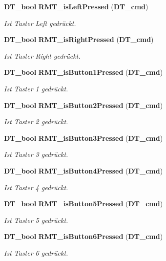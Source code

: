 \begin{DoxyCompactItemize}
{\bf DT\_\-bool} {\bf RMT\_\-isLeftPressed} ({\bf DT\_\-cmd})
\begin{DoxyCompactList}\small\item\em Ist Taster Left gedrückt. \item\end{DoxyCompactList}\item 
{\bf DT\_\-bool} {\bf RMT\_\-isRightPressed} ({\bf DT\_\-cmd})
\begin{DoxyCompactList}\small\item\em Ist Taster Right gedrückt. \item\end{DoxyCompactList}\item 
{\bf DT\_\-bool} {\bf RMT\_\-isButton1Pressed} ({\bf DT\_\-cmd})
\begin{DoxyCompactList}\small\item\em Ist Taster 1 gedrückt. \item\end{DoxyCompactList}\item 
{\bf DT\_\-bool} {\bf RMT\_\-isButton2Pressed} ({\bf DT\_\-cmd})
\begin{DoxyCompactList}\small\item\em Ist Taster 2 gedrückt. \item\end{DoxyCompactList}\item 
{\bf DT\_\-bool} {\bf RMT\_\-isButton3Pressed} ({\bf DT\_\-cmd})
\begin{DoxyCompactList}\small\item\em Ist Taster 3 gedrückt. \item\end{DoxyCompactList}\item 
{\bf DT\_\-bool} {\bf RMT\_\-isButton4Pressed} ({\bf DT\_\-cmd})
\begin{DoxyCompactList}\small\item\em Ist Taster 4 gedrückt. \item\end{DoxyCompactList}\item 
{\bf DT\_\-bool} {\bf RMT\_\-isButton5Pressed} ({\bf DT\_\-cmd})
\begin{DoxyCompactList}\small\item\em Ist Taster 5 gedrückt. \item\end{DoxyCompactList}\item 
{\bf DT\_\-bool} {\bf RMT\_\-isButton6Pressed} ({\bf DT\_\-cmd})
\begin{DoxyCompactList}\small\item\em Ist Taster 6 gedrückt. \item\end{DoxyCompactList}\end{DoxyCompactItemize}


